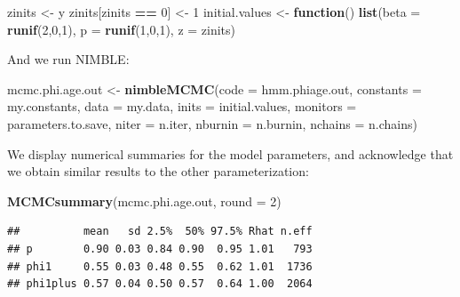 \documentclass[
  12pt,
]{krantz}
\newenvironment{Shaded}{\begin{snugshade}}{\end{snugshade}}
\newcommand{\AttributeTok}[1]{\textcolor[rgb]{0.13,0.29,0.53}{#1}}
\newcommand{\ControlFlowTok}[1]{\textcolor[rgb]{0.13,0.29,0.53}{\textbf{#1}}}
\newcommand{\DecValTok}[1]{\textcolor[rgb]{0.00,0.00,0.81}{#1}}
\newcommand{\FunctionTok}[1]{\textcolor[rgb]{0.13,0.29,0.53}{\textbf{#1}}}
\newcommand{\NormalTok}[1]{#1}
\newcommand{\OtherTok}[1]{\textcolor[rgb]{0.56,0.35,0.01}{#1}}
\newcommand{\SpecialCharTok}[1]{\textcolor[rgb]{0.81,0.36,0.00}{\textbf{#1}}}
\begin{document}
\begin{Shaded}
\begin{Highlighting}[]
\NormalTok{zinits }\OtherTok{\textless{}{-}}\NormalTok{ y}
\NormalTok{zinits[zinits }\SpecialCharTok{==} \DecValTok{0}\NormalTok{] }\OtherTok{\textless{}{-}} \DecValTok{1}
\NormalTok{initial.values }\OtherTok{\textless{}{-}} \ControlFlowTok{function}\NormalTok{() }\FunctionTok{list}\NormalTok{(}\AttributeTok{beta =} \FunctionTok{runif}\NormalTok{(}\DecValTok{2}\NormalTok{,}\DecValTok{0}\NormalTok{,}\DecValTok{1}\NormalTok{),}
                                  \AttributeTok{p =} \FunctionTok{runif}\NormalTok{(}\DecValTok{1}\NormalTok{,}\DecValTok{0}\NormalTok{,}\DecValTok{1}\NormalTok{),}
                                  \AttributeTok{z =}\NormalTok{ zinits)}
\end{Highlighting}
\end{Shaded}

And we run NIMBLE:

\begin{Shaded}
\begin{Highlighting}[]
\NormalTok{mcmc.phi.age.out }\OtherTok{\textless{}{-}} \FunctionTok{nimbleMCMC}\NormalTok{(}\AttributeTok{code =}\NormalTok{ hmm.phiage.out, }
                               \AttributeTok{constants =}\NormalTok{ my.constants,}
                               \AttributeTok{data =}\NormalTok{ my.data,              }
                               \AttributeTok{inits =}\NormalTok{ initial.values,}
                               \AttributeTok{monitors =}\NormalTok{ parameters.to.save,}
                               \AttributeTok{niter =}\NormalTok{ n.iter,}
                               \AttributeTok{nburnin =}\NormalTok{ n.burnin, }
                               \AttributeTok{nchains =}\NormalTok{ n.chains)}
\end{Highlighting}
\end{Shaded}

We display numerical summaries for the model parameters, and acknowledge that we obtain similar results to the other parameterization:

\begin{Shaded}
\begin{Highlighting}[]
\FunctionTok{MCMCsummary}\NormalTok{(mcmc.phi.age.out, }\AttributeTok{round =} \DecValTok{2}\NormalTok{)}
\end{Highlighting}
\end{Shaded}

\begin{verbatim}
##          mean   sd 2.5%  50% 97.5% Rhat n.eff
## p        0.90 0.03 0.84 0.90  0.95 1.01   793
## phi1     0.55 0.03 0.48 0.55  0.62 1.01  1736
## phi1plus 0.57 0.04 0.50 0.57  0.64 1.00  2064
\end{verbatim}
\end{document}
